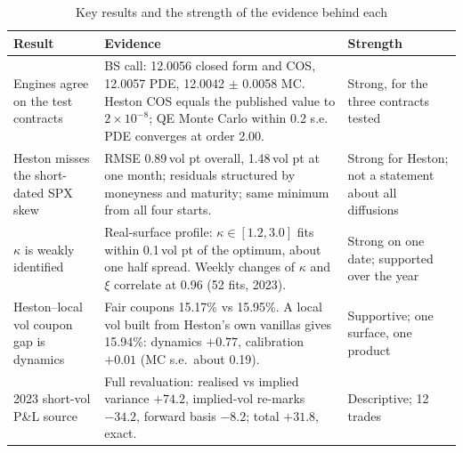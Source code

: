 \documentclass[10pt,letterpaper]{article}
\newcommand{\vp}{\,vol pt}
\begin{document}
\begin{table}[H]
\caption{Key results and the strength of the evidence behind each}\label{tab:summary}
\small
\begin{tabularx}{\textwidth}{L{1.55in}XL{0.95in}}
\toprule
\textbf{Result} & \textbf{Evidence} & \textbf{Strength}\\
\midrule
Engines agree on the test contracts &
BS call: 12.0056 closed form and COS, 12.0057 PDE, 12.0042 $\pm$ 0.0058 MC. Heston COS equals the published value
to $2\times10^{-8}$; QE Monte Carlo within 0.2 s.e. PDE converges at order 2.00. & Strong, for the three contracts tested\\
Heston misses the short-dated SPX skew &
RMSE 0.89\vp{} overall, 1.48\vp{} at one month; residuals structured by moneyness and maturity; same minimum
from all four starts. & Strong for Heston; not a statement about all diffusions\\
$\kappa$ is weakly identified &
Real-surface profile: $\kappa \in [1.2, 3.0]$ fits within 0.1\vp{} of the optimum, about one half spread. Weekly
changes of $\kappa$ and $\xi$ correlate at 0.96 (52 fits, 2023). & Strong on one date; supported over the year\\
Heston--local vol coupon gap is dynamics &
Fair coupons 15.17\% vs 15.95\%. A local vol built from Heston's own vanillas gives 15.94\%: dynamics
$+0.77$, calibration $+0.01$ (MC s.e.\ about 0.19). & Supportive; one surface, one product\\
2023 short-vol P\&L source &
Full revaluation: realised vs implied variance $+74.2$, implied-vol re-marks $-34.2$, forward basis $-8.2$; total
$+31.8$, exact. & Descriptive; 12 trades\\
\bottomrule
\end{tabularx}
\end{table}
\end{document}
